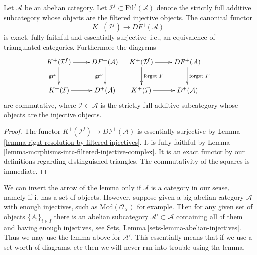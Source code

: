 \begin{lemma}
\label{lemma-filtered-localization-functor}
Let $\mathcal{A}$ be an abelian category.
Let $\mathcal{I}^f \subset \text{Fil}^f(\mathcal{A})$
denote the strictly full additive subcategory whose objects are
the filtered injective objects. The canonical functor
$$
K^{+}(\mathcal{I}^f)
\longrightarrow
DF^{+}(\mathcal{A})
$$
is exact, fully faithful and essentially surjective, i.e., an
equivalence of triangulated categories. Furthermore the diagrams
$$
\xymatrix{
K^{+}(\mathcal{I}^f) \ar[d]_{\text{gr}^p} \ar[r] &
DF^{+}(\mathcal{A}) \ar[d]_{\text{gr}^p} \\
K^{+}(\mathcal{I}) \ar[r] &
D^{+}(\mathcal{A})
}
\quad
\xymatrix{
K^{+}(\mathcal{I}^f) \ar[d]^{\text{forget }F} \ar[r] &
DF^{+}(\mathcal{A}) \ar[d]^{\text{forget }F} \\
K^{+}(\mathcal{I}) \ar[r] &
D^{+}(\mathcal{A})
}
$$
are commutative, where $\mathcal{I} \subset \mathcal{A}$ is the
strictly full additive subcategory whose objects are
the injective objects.
\end{lemma}

\begin{proof}
The functor $K^{+}(\mathcal{I}^f) \to DF^{+}(\mathcal{A})$
is essentially surjective by
Lemma \ref{lemma-right-resolution-by-filtered-injectives}.
It is fully faithful by
Lemma \ref{lemma-morphisms-into-filtered-injective-complex}.
It is an exact functor by our definitions regarding distinguished
triangles.
The commutativity of the squares is immediate.
\end{proof}

\begin{remark}
\label{remark-filtered-localization-big}
We can invert the arrow of the lemma
only if $\mathcal{A}$ is a category in our sense,
namely if it has a set of objects. However, suppose given a big abelian
category $\mathcal{A}$ with enough injectives, such as
$\text{Mod}(\mathcal{O}_X)$ for example. Then for any given set of objects
$\{A_i\}_{i\in I}$ there is an abelian subcategory
$\mathcal{A}' \subset \mathcal{A}$ containing all of them
and having enough injectives, see
Sets, Lemma \ref{sets-lemma-abelian-injectives}.
Thus we may use the lemma above for $\mathcal{A}'$.
This essentially means that if we use a set worth of diagrams, etc 
then we will never run into trouble using the lemma.
\end{remark}

